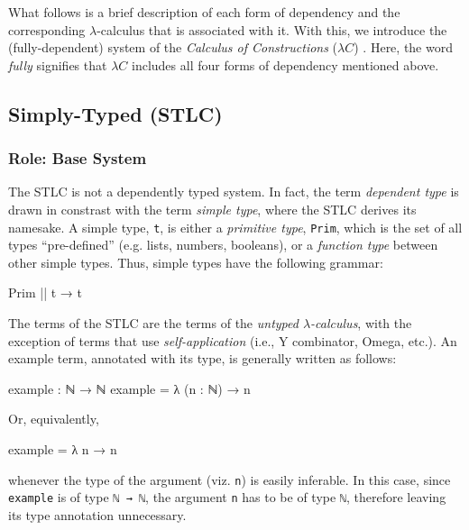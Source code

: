 \documentclass[12pt]{article}
\begin{document}
What follows is a brief description of each form of dependency and the
corresponding \(\lambda\)-calculus that is associated with it. With this, we
introduce the (fully-dependent) system of the \textit{Calculus of Constructions}
(\(\lambda C\)) \cite{}. Here, the word \textit{fully} signifies that \(\lambda C\)
includes all four forms of dependency mentioned above.

\subsection*{Simply-Typed (STLC)}
\subsubsection*{Role: Base System}
The STLC is not a dependently typed system. In fact, the term {\em dependent type}
is drawn in constrast with the term {\em simple type}, where the STLC derives
its namesake. A simple type, {\tt t}, is either a {\em primitive type}, {\tt Prim},
which is the set of all types ``pre-defined'' (e.g. lists, numbers, booleans),
or a {\em function type} between other simple types. Thus, simple types have the
following grammar:
\begin{center}
\begin{minipage}{0.5\textwidth}
\begin{code}
Prim || t → t
\end{code}
\end{minipage}
\end{center}
The terms of the STLC are the terms of the \textit{untyped \(\lambda\)-calculus},
with the exception of terms that use \textit{self-application} (i.e., Y
combinator, Omega, etc.). An example term, annotated with its type, is generally
written as follows:
\begin{center}
\begin{minipage}{0.5\textwidth}
\begin{code}
example : ℕ → ℕ
example = λ (n : ℕ) → n
\end{code}
\end{minipage}
\end{center}
Or, equivalently,
\begin{center}
\begin{minipage}{0.5\textwidth}
\begin{code}
example = λ n → n
\end{code}
\end{minipage}
\end{center}
whenever the type of the argument (viz. {\tt n}) is easily inferable. In this
case, since {\tt example} is of type {\tt ℕ → ℕ}, the argument {\tt n} has
to be of type {\tt ℕ}, therefore leaving its type annotation unnecessary.
\end{document}
